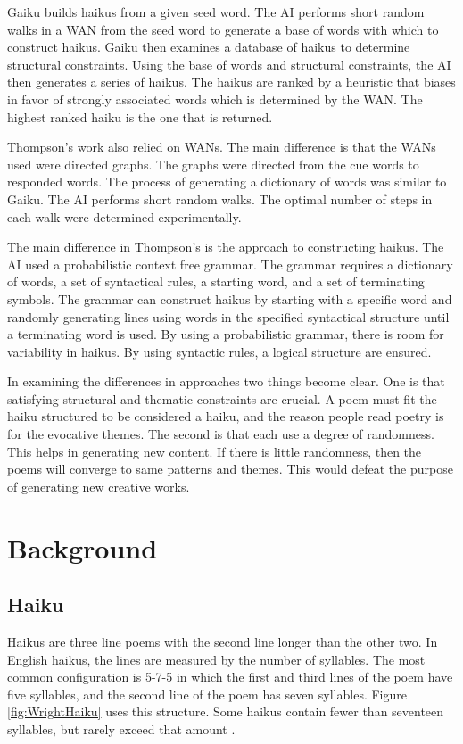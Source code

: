 \documentclass[]{article}
\begin{document}
Gaiku builds haikus from a given seed word. The AI performs short random walks in a WAN from the seed word to generate a base of words with which to construct haikus. Gaiku then examines a database of haikus to determine structural constraints. Using the base of words and structural constraints, the AI then generates a series of haikus. The haikus are ranked by a heuristic that biases in favor of strongly associated words which is determined by the WAN. The highest ranked haiku is the one that is returned.

Thompson's work also relied on WANs. The main difference is that the WANs used were directed graphs. The graphs were directed from the cue words to responded words. The process of generating a dictionary of words was similar to Gaiku. The AI performs short random walks. The optimal number of steps in each walk were determined experimentally\cite{grammars}.

The main difference in Thompson's is the approach to constructing haikus. The AI used a probabilistic context free grammar. The grammar requires a dictionary of words, a set of syntactical rules, a starting word, and a set of terminating symbols. The grammar can construct haikus by starting with a specific word and randomly generating lines using words in the specified syntactical structure until a terminating word is used. By using a probabilistic grammar, there is room for variability in haikus. By using syntactic rules, a logical structure are ensured.

In examining the differences in approaches two things become clear. One is that satisfying structural and thematic constraints are crucial. A poem must fit the haiku structured to be considered a haiku, and the reason people read poetry is for the evocative themes. The second is that each use a degree of randomness. This helps in generating new content. If there is little randomness, then the poems will converge to same patterns and themes. This would defeat the purpose of generating new creative works.

\section{Background}

\subsection{Haiku}
Haikus are three line poems with the second line longer than the other two. In English haikus, the lines are measured by the number of syllables. The most common configuration is 5-7-5 in which the first and third lines of the poem have five syllables, and the second line of the poem has seven syllables. Figure \ref{fig:WrightHaiku} uses this structure. Some haikus contain fewer than seventeen syllables, but rarely exceed that amount \cite{Higginson}.
\end{document}
